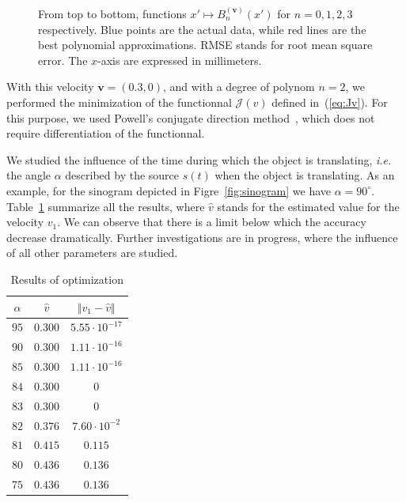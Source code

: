 \documentclass[twocolumn]{IEEEtran}
\newcommand{\ie}{\emph{i.e.} }
\newcommand{\bv}{\mathbf{v}}
\newcommand{\Bnv}{B_n^{(\bv)}}
\begin{document}
\begin{figure}
\begin{tabular}{cc}
	\end{tabular}
	\caption{From top to bottom, functions $x' \mapsto \Bnv(x')$ for $n = 0,1,2,3$ respectively. Blue points are the actual data, while red lines are the best polynomial approximations. RMSE stands for root mean square error. The $x$-axis are expressed in millimeters.\label{fig:Bnx}}
\end{figure}

With this velocity $\bv = (0.3,0)$, and with a degree of polynom $n = 2$, we performed the minimization of the functionnal $\mathcal{J}(v)$ defined in~(\ref{eq:Jv}). For this purpose, we used Powell's conjugate direction method~\cite{powell1964efficient}, which does not require differentiation of the functionnal.

We studied the influence of the time during which the object is translating, \ie the angle $\alpha$ described by the source $s(t)$ when the object is translating. As an example, for the sinogram depicted in Figre~\ref{fig:sinogram} we have $\alpha = 90^{\circ}$. Table~\ref{tab:results} summarize all the results, where $\hat{v}$ stands for the estimated value for the velocity $v_1$. We can observe that there is a limit below which the accuracy decrease dramatically. Further investigations are in progress, where the influence of all other parameters are studied.

\begin{table}[!ht]
\caption{Results of optimization \label{tab:results}}
\centering
	\begin{tabular}{ccc}
	  $\alpha$ & $\hat{v}$ & $\Vert v_1 - \hat{v}\Vert$ \\
	  \hline
		$95$ & $0.30$0 & $5.55 \cdot 10^{-17}$ \\
		$90$ & $0.300$ & $1.11 \cdot 10^{-16}$ \\
		$85$ & $0.300$ & $1.11 \cdot 10^{-16}$ \\
		$84$ & $0.300$ & $0$ \\
		$83$ & $0.300$ & $0$ \\
		$82$ & $0.376$ & $7.60 \cdot 10^{-2}$ \\
		$81$ & $0.415$ & $0.115$ \\
		$80$ & $0.436$ & $0.136$ \\
		$75$ & $0.436$ & $0.136$
\end{tabular}
\end{table}
\end{document}
